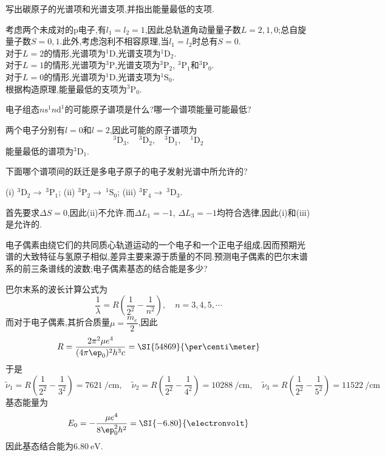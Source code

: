 \documentclass{ctexart}
\begin{document}
\begin{homework}[13.]
    写出碳原子的光谱项和光谱支项,并指出能量最低的支项.
\end{homework}
\begin{solution}
    考虑两个未成对的p电子,有$l_1=l_2=1$,因此总轨道角动量量子数$L=2,1,0$;总自旋量子数$S=0,1$.此外,考虑泡利不相容原理,当$l_1=l_2$时总有$S=0$.\\
    对于$L=2$的情形,光谱项为$^1\text{D}$,光谱支项为$^1\text{D}_2$.\\
    对于$L=1$的情形,光谱项为$^3\text{P}$,光谱支项为$^3\text{P}_2$, $^3\text{P}_1$和$^3\text{P}_0$.\\
    对于$L=0$的情形,光谱项为$^1\text{D}$,光谱支项为$^1\text{S}_0$.\\
    根据构造原理,能量最低的支项为$^3\text{P}_0$.
\end{solution}
\begin{homework}[14.]
    电子组态$n\text{s}^1n\text{d}^1$的可能原子谱项是什么?哪一个谱项能量可能最低?
\end{homework}
\begin{solution}
    两个电子分别有$l=0$和$l=2$,因此可能的原子谱项为
    \[^3\text{D}_3,\quad^3\text{D}_2,\quad^3\text{D}_1,\quad^1\text{D}_2\]
    能量最低的谱项为$^3\text{D}_1$.
\end{solution}
\begin{homework}[15.]
    下面哪个谱项间的跃迁是多电子原子的电子发射光谱中所允许的?
    \begin{center}
        (i) $^3\text{D}_2\to\ ^3\text{P}_1$;    (ii) $^3\text{P}_2\to\ ^1\text{S}_0$;     (iii) $^3\text{F}_4\to\ ^3\text{D}_3$.
    \end{center}
\end{homework}
\begin{solution}
    首先要求$\Delta S=0$,因此(ii)不允许.而$\Delta L_1=-1$, $\Delta L_3=-1$均符合选律,因此(i)和(iii)是允许的.
\end{solution}
\begin{homework}[16.]
    电子偶素由绕它们的共同质心轨道运动的一个电子和一个正电子组成,因而预期光谱的大致特征与氢原子相似,差异主要来源于质量的不同.预测电子偶素的巴尔末谱系的前三条谱线的波数;电子偶素基态的结合能是多少?
\end{homework}
\begin{solution}
    巴尔末系的波长计算公式为
    \[\dfrac{1}{\lambda}=R\left(\dfrac{1}{2^2}-\dfrac{1}{n^2}\right),\quad n=3,4,5,\cdots\]
    而对于电子偶素,其折合质量$\mu=\dfrac{m_e}{2}$,因此
    \[R=\dfrac{2\pi^2\mu e^4}{(4\pi\ep_0)^2h^3c}=\SI{54869}{\per\centi\meter}\]
    于是
    \[\tilde{\nu}_1=R\left(\dfrac{1}{2^2}-\dfrac{1}{3^2}\right)=\SI{7621}{\per\centi\meter},\quad\tilde{\nu}_2=R\left(\dfrac{1}{2^2}-\dfrac{1}{4^2}\right)=\SI{10288}{\per\centi\meter},\quad\tilde{\nu}_3=R\left(\dfrac{1}{2^2}-\dfrac{1}{5^2}\right)=\SI{11522}{\per\centi\meter}\]
    基态能量为
    \[E_0=-\dfrac{\mu e^4}{8\ep_0^2h^2}=\SI{-6.80}{\electronvolt}\]
    因此基态结合能为$\SI{6.80}{\electronvolt}$.
\end{solution}
\end{document}
